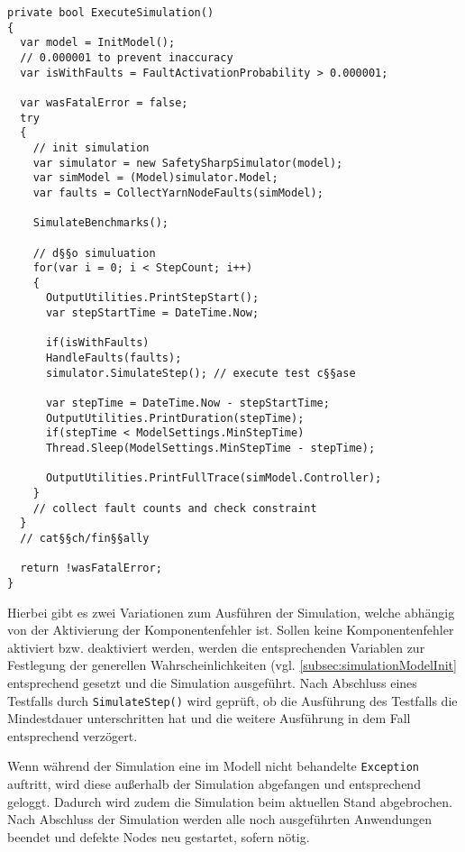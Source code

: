 \begin{lstlisting}[label=lst:hadoopSimulation,style=cs,
caption={[Ausführung der Simulation]
    Ausführung der Simulation (gekürzt).}]
private bool ExecuteSimulation()
{
  var model = InitModel();
  // 0.000001 to prevent inaccuracy
  var isWithFaults = FaultActivationProbability > 0.000001;
  
  var wasFatalError = false;
  try
  {
    // init simulation
    var simulator = new SafetySharpSimulator(model);
    var simModel = (Model)simulator.Model;
    var faults = CollectYarnNodeFaults(simModel);
    
    SimulateBenchmarks();
    
    // d§§o simuluation
    for(var i = 0; i < StepCount; i++)
    {
      OutputUtilities.PrintStepStart();
      var stepStartTime = DateTime.Now;
      
      if(isWithFaults)
      HandleFaults(faults);
      simulator.SimulateStep(); // execute test c§§ase
      
      var stepTime = DateTime.Now - stepStartTime;
      OutputUtilities.PrintDuration(stepTime);
      if(stepTime < ModelSettings.MinStepTime)
      Thread.Sleep(ModelSettings.MinStepTime - stepTime);
      
      OutputUtilities.PrintFullTrace(simModel.Controller);
    }
    // collect fault counts and check constraint
  }
  // cat§§ch/fin§§ally
  
  return !wasFatalError;
}
\end{lstlisting}

Hierbei gibt es zwei Variationen zum Ausführen der Simulation, welche abhängig von der Aktivierung der Komponentenfehler ist.
Sollen keine Komponentenfehler aktiviert bzw. deaktiviert werden, werden die entsprechenden Variablen zur Festlegung der generellen Wahrscheinlichkeiten (vgl. \cref{subsec:simulationModelInit} entsprechend gesetzt und die Simulation ausgeführt.
Nach Abschluss eines Testfalls durch \texttt{SimulateStep()} wird geprüft, ob die Ausführung des Testfalls die Mindestdauer unterschritten hat und die weitere Ausführung in dem Fall entsprechend verzögert.

Wenn während der Simulation eine im Modell nicht behandelte \texttt{Exception} auftritt, wird diese außerhalb der Simulation abgefangen und entsprechend geloggt.
Dadurch wird zudem die Simulation beim aktuellen Stand abgebrochen.
Nach Abschluss der Simulation werden alle noch ausgeführten Anwendungen beendet und defekte Nodes neu gestartet, sofern nötig.

